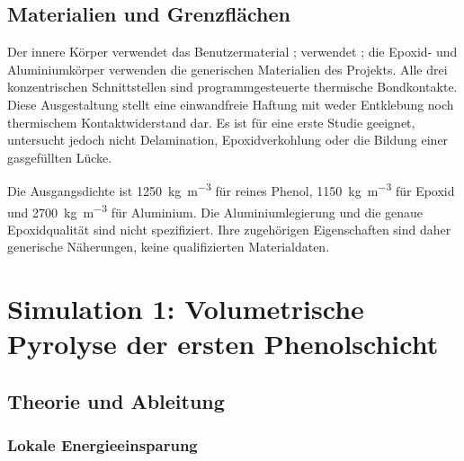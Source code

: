 \documentclass[oneside,openany]{amsdtx}
\begin{document}
\subsection{Materialien und Grenzflächen}

Der innere Körper  verwendet das Benutzermaterial ;  verwendet ; die Epoxid- und Aluminiumkörper verwenden die generischen Materialien des Projekts. Alle drei konzentrischen Schnittstellen sind programmgesteuerte thermische Bondkontakte. Diese Ausgestaltung stellt eine einwandfreie Haftung mit weder Entklebung noch thermischem Kontaktwiderstand dar. Es ist für eine erste Studie geeignet, untersucht jedoch nicht Delamination, Epoxidverkohlung oder die Bildung einer gasgefüllten Lücke.

Die Ausgangsdichte ist \SI{1250}{kg.m^{-3}} für reines Phenol, \SI{1150}{kg.m^{-3}} für Epoxid und \SI{2700}{kg.m^{-3}} für Aluminium. Die Aluminiumlegierung und die genaue Epoxidqualität sind nicht spezifiziert. Ihre zugehörigen Eigenschaften sind daher generische Näherungen, keine qualifizierten Materialdaten.

\clearpage
\section{Simulation 1: Volumetrische Pyrolyse der ersten Phenolschicht}

\subsection{Theorie und Ableitung}

\subsubsection{Lokale Energieeinsparung}
\end{document}
